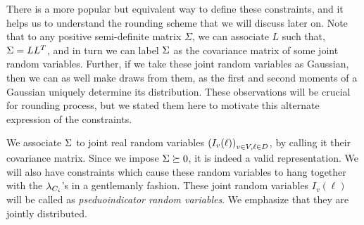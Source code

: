 There is a more popular but equivalent way to define these constraints, and it helps us to understand the rounding scheme that we will discuss later on. 
Note that to any positive semi-definite matrix $\Sigma$, we can associate $L$ such that, $\Sigma = LL^T$, and in turn we can label $\Sigma$ as the covariance matrix of some joint random variables. 
Further, if we take these joint random variables as Gaussian, then we can as well make draws from them, as the first and second moments of a Gaussian  uniquely determine its distribution. 
These observations will be crucial for rounding process, but we stated them here to motivate this alternate expression of the constraints. 

We associate $\Sigma$ to joint real random variables $\left(I_v(\ell)\right)_{v\in V, \ell \in D}$, by calling it their covariance matrix. Since we impose $\Sigma \succeq 0$, it is indeed a valid representation. 
We will also have constraints which cause these random variables to hang together with the $\lambda_{C_i}$'s in a gentlemanly fashion. 
These joint random variables $I_v(\ell)$ will be called as \textit{pseduoindicator random variables}. 
We emphasize that they are jointly distributed. 

